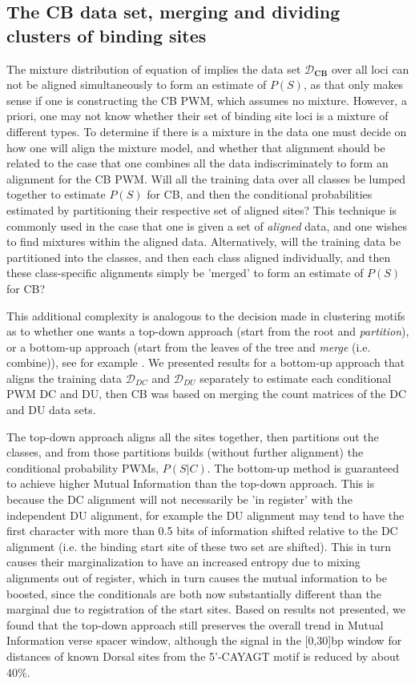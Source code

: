 \subsection{The CB data set, merging and dividing clusters of binding sites}
   The mixture distribution of equation of  implies the data set $\mathcal D_{\textbf{CB}}$  over all loci can not be aligned simultaneously to form an estimate of $P(S)$, as that only makes sense if one is constructing the CB PWM, which assumes no mixture.  However, a priori, one may not know whether their set of binding site loci is a mixture of different types.  To determine if there is a mixture in the data one must decide on how one will align the mixture model, and whether that alignment should be related to the case that one combines all the data indiscriminately to form an alignment for the CB PWM.  Will all the training data over all classes be lumped together to estimate $P(S)$ for CB, and then the conditional probabilities estimated by partitioning their respective set of aligned sites?  This technique is commonly used in the case that one is given a set of \textit{aligned} data, and one wishes to find mixtures within the aligned data.  Alternatively, will the training data be partitioned into the classes, and then each class aligned individually, and then these class-specific alignments simply be 'merged' to form an estimate of $P(S)$ for CB?

This additional complexity is analogous to the decision made in clustering motifs as to whether one wants a top-down approach (start from the root and \textit{partition}), or a bottom-up approach (start from the leaves of the tree and \textit{merge} (i.e. combine)), see for example \cite{10.1371}\cite{Down01012005}\cite{Jain:1999:DCR:331499.331504}.  We presented results for a bottom-up approach that aligns the training data $\mathcal D_{DC}$ and $\mathcal D_{DU}$ separately to estimate each conditional PWM DC and DU, then CB was based on merging the count matrices of the DC and DU data sets.

The top-down approach aligns all the sites together, then partitions out the classes, and from those partitions builds (without further alignment) the conditional probability PWMs, $P(S|C)$.  The bottom-up method is guaranteed to achieve higher Mutual Information than the top-down approach.  This is because the DC alignment will not necessarily be 'in register' with the independent DU alignment, for example the DU alignment may tend to have the first character with more than 0.5 bits of information shifted relative to the DC alignment (i.e. the binding start site of these two set are shifted). This in turn causes their marginalization to have an increased entropy due to mixing alignments out of register, which in turn causes the mutual information to be boosted, since the conditionals are both now substantially different than the marginal due to registration of the start sites.  Based on results not presented, we found that the top-down approach still preserves the overall trend in Mutual Information verse spacer window, although the signal in the [0,30]bp window for distances of known Dorsal sites from the 5'-CAYAGT motif is reduced by about 40\%.

